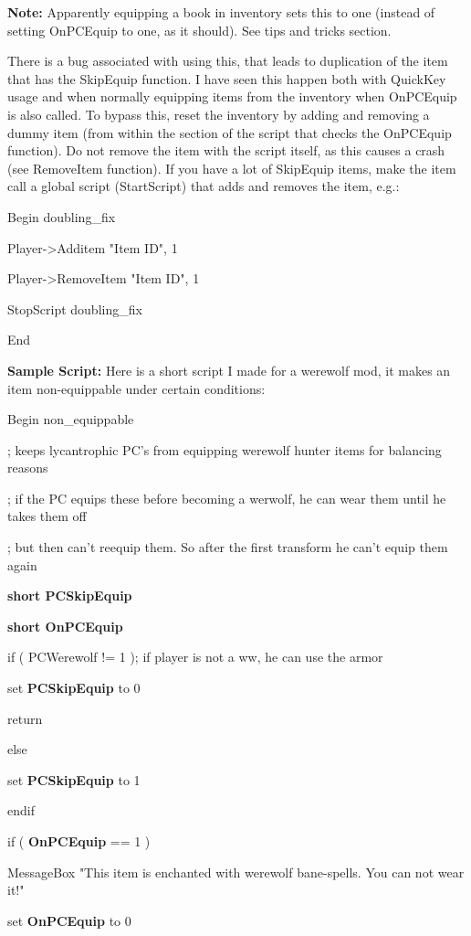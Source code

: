 \documentclass[
]{article}
\begin{document}
\textbf{Note:} Apparently equipping a book in inventory sets this to one
(instead of setting OnPCEquip to one, as it should). See tips and tricks
section.

There is a bug associated with using this, that leads to duplication of
the item that has the SkipEquip function. I have seen this happen both
with QuickKey usage and when normally equipping items from the inventory
when OnPCEquip is also called. To bypass this, reset the inventory by
adding and removing a dummy item (from within the section of the script
that checks the OnPCEquip function). Do not remove the item with the
script itself, as this causes a crash (see RemoveItem function). If you
have a lot of SkipEquip items, make the item call a global script
(StartScript) that adds and removes the item, e.g.:

Begin doubling\_fix

Player-\textgreater Additem "Item ID", 1

Player-\textgreater RemoveItem "Item ID", 1

StopScript doubling\_fix

End

\textbf{Sample Script:} Here is a short script I made for a werewolf
mod, it makes an item non-equippable under certain conditions:

Begin non\_equippable

; keeps lycantrophic PC's from equipping werewolf hunter items for
balancing reasons

; if the PC equips these before becoming a werwolf, he can wear them
until he takes them off

; but then can't reequip them. So after the first transform he can't
equip them again

\textbf{short PCSkipEquip}

\textbf{short OnPCEquip}

if ( PCWerewolf != 1 ); if player is not a ww, he can use the armor

set \textbf{PCSkipEquip} to 0

return

else

set \textbf{PCSkipEquip} to 1

endif

if ( \textbf{OnPCEquip} == 1 )

MessageBox "This item is enchanted with werewolf bane-spells. You can
not wear it!"

set \textbf{OnPCEquip} to 0
\end{document}
